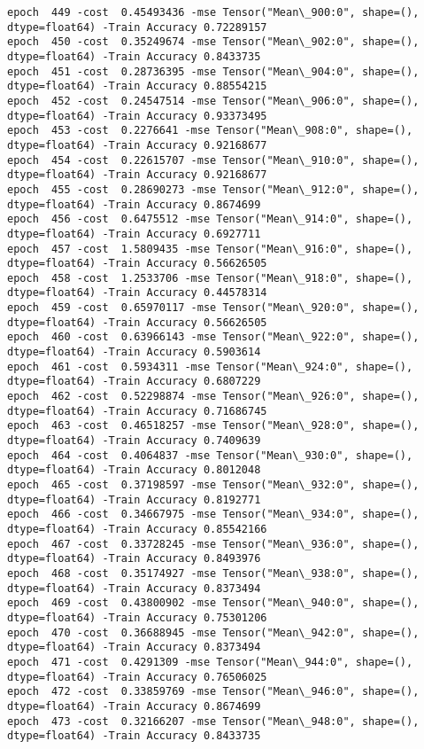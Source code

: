 \documentclass[11pt]{article}
\begin{document}
\begin{Verbatim}[commandchars=\\\{\}]
epoch  449 -cost  0.45493436 -mse Tensor("Mean\_900:0", shape=(), dtype=float64) -Train Accuracy 0.72289157
epoch  450 -cost  0.35249674 -mse Tensor("Mean\_902:0", shape=(), dtype=float64) -Train Accuracy 0.8433735
epoch  451 -cost  0.28736395 -mse Tensor("Mean\_904:0", shape=(), dtype=float64) -Train Accuracy 0.88554215
epoch  452 -cost  0.24547514 -mse Tensor("Mean\_906:0", shape=(), dtype=float64) -Train Accuracy 0.93373495
epoch  453 -cost  0.2276641 -mse Tensor("Mean\_908:0", shape=(), dtype=float64) -Train Accuracy 0.92168677
epoch  454 -cost  0.22615707 -mse Tensor("Mean\_910:0", shape=(), dtype=float64) -Train Accuracy 0.92168677
epoch  455 -cost  0.28690273 -mse Tensor("Mean\_912:0", shape=(), dtype=float64) -Train Accuracy 0.8674699
epoch  456 -cost  0.6475512 -mse Tensor("Mean\_914:0", shape=(), dtype=float64) -Train Accuracy 0.6927711
epoch  457 -cost  1.5809435 -mse Tensor("Mean\_916:0", shape=(), dtype=float64) -Train Accuracy 0.56626505
epoch  458 -cost  1.2533706 -mse Tensor("Mean\_918:0", shape=(), dtype=float64) -Train Accuracy 0.44578314
epoch  459 -cost  0.65970117 -mse Tensor("Mean\_920:0", shape=(), dtype=float64) -Train Accuracy 0.56626505
epoch  460 -cost  0.63966143 -mse Tensor("Mean\_922:0", shape=(), dtype=float64) -Train Accuracy 0.5903614
epoch  461 -cost  0.5934311 -mse Tensor("Mean\_924:0", shape=(), dtype=float64) -Train Accuracy 0.6807229
epoch  462 -cost  0.52298874 -mse Tensor("Mean\_926:0", shape=(), dtype=float64) -Train Accuracy 0.71686745
epoch  463 -cost  0.46518257 -mse Tensor("Mean\_928:0", shape=(), dtype=float64) -Train Accuracy 0.7409639
epoch  464 -cost  0.4064837 -mse Tensor("Mean\_930:0", shape=(), dtype=float64) -Train Accuracy 0.8012048
epoch  465 -cost  0.37198597 -mse Tensor("Mean\_932:0", shape=(), dtype=float64) -Train Accuracy 0.8192771
epoch  466 -cost  0.34667975 -mse Tensor("Mean\_934:0", shape=(), dtype=float64) -Train Accuracy 0.85542166
epoch  467 -cost  0.33728245 -mse Tensor("Mean\_936:0", shape=(), dtype=float64) -Train Accuracy 0.8493976
epoch  468 -cost  0.35174927 -mse Tensor("Mean\_938:0", shape=(), dtype=float64) -Train Accuracy 0.8373494
epoch  469 -cost  0.43800902 -mse Tensor("Mean\_940:0", shape=(), dtype=float64) -Train Accuracy 0.75301206
epoch  470 -cost  0.36688945 -mse Tensor("Mean\_942:0", shape=(), dtype=float64) -Train Accuracy 0.8373494
epoch  471 -cost  0.4291309 -mse Tensor("Mean\_944:0", shape=(), dtype=float64) -Train Accuracy 0.76506025
epoch  472 -cost  0.33859769 -mse Tensor("Mean\_946:0", shape=(), dtype=float64) -Train Accuracy 0.8674699
epoch  473 -cost  0.32166207 -mse Tensor("Mean\_948:0", shape=(), dtype=float64) -Train Accuracy 0.8433735

\end{Verbatim}
\end{document}
